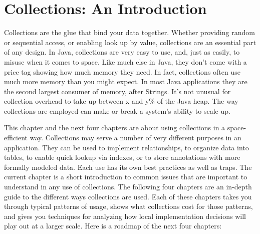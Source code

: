 \chapter{Collections: An Introduction}
\label{chapter:brief-introduction-collections}

Collections are the glue that bind your data together.  Whether 
providing random or sequential access, or enabling
look up by value, collections are an essential part of any
design. In Java, collections are very easy to use, and, just as easily, to misuse when
it comes to space. Like much else in Java, they don't come with a price tag
showing how much memory they need. In fact, collections
often use much more memory than you might expect. In most Java applications they are the second largest consumer of memory, after
Strings. It's not unusual for collection overhead to take up between x and y\%
of the Java heap. The way collections are employed can make
or break a system's ability to scale up.


This chapter and the next four chapters are about using
collections in a space-efficient way.  Collections may serve a number of very
different purposes in an application. They can be used to implement
relationships, to organize data into tables, to enable quick lookup via indexes, or
to store annotations with more formally modeled data. Each use
has its own best practices as well as traps. The current chapter
is a short introduction to common issues that are important to understand in
any use of collections. The following four chapters are an in-depth guide to 
the different ways collections are used. Each of these chapters takes
you through typical patterns of usage, shows what collections cost for those
patterns, and gives you techniques for analyzing how local implementation
decisions will play out at a larger scale. Here is a roadmap of the next four chapters:

%

